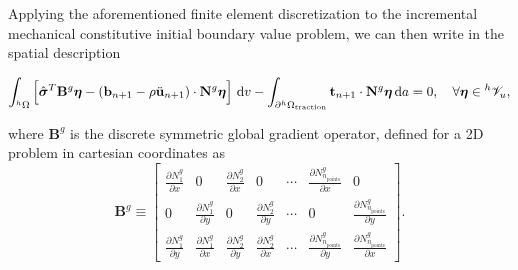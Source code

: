 Applying the aforementioned finite element discretization to the incremental mechanical constitutive initial boundary value problem, we can then write in the spatial description
\begin{highlight}
    \begin{equation}
        \int_{^h\Omega}\left[\hat{\bm{\sigma}}^T\mathbf B^g\bm{\eta} - (\mathbf b_{n+1} - \rho\ddot{\mathbf u}_{n+1}) \cdot \mathbf N^g \bm{\eta} \right]\,\mathrm{d} v -\int_{\partial ^h\Omega_\text{traction}} \mathbf t_{n+1}\cdot \mathbf N^g\bm{\eta} \,\mathrm{d} a = 0,\quad \forall \bm{\eta} \in {}^h\mathscr{V}_u,  \label{eq:forma_fraca_disc}
    \end{equation}
\end{highlight}
where $\mathbf B^g$ is the discrete symmetric global gradient operator, defined for a 2D problem in cartesian coordinates as
\begin{equation}
    \mathbf B^g\equiv \left[
    \begin{array}{ccccccc}
         \displaystyle{\frac{\partial N_1^g}{\partial x}} & 0 & \displaystyle{\frac{\partial N_2^g}{\partial x}} & 0 & \cdots &
         \displaystyle{\frac{\partial N_{n_\text{points}}^g}{\partial x}} & 0\\
         0 & \displaystyle{\frac{\partial N_1^g}{\partial y}} & 0 & \displaystyle{\frac{\partial N_2^g}{\partial y}} & \cdots &
         0 & \displaystyle{\frac{\partial N_{n_\text{points}}^g}{\partial y}}\\
         \displaystyle{\frac{\partial N_1^g}{\partial y}} & \displaystyle{\frac{\partial N_1^g}{\partial x}} & \displaystyle{\frac{\partial N_2^g}{\partial y}} & \displaystyle{\frac{\partial N_2^g}{\partial x}} & \cdots &
         \displaystyle{\frac{\partial N_{n_\text{points}}^g}{\partial y}} & \displaystyle{\frac{\partial N_{n_\text{points}}^g}{\partial x}}
    \end{array}
    \right].
\end{equation}

